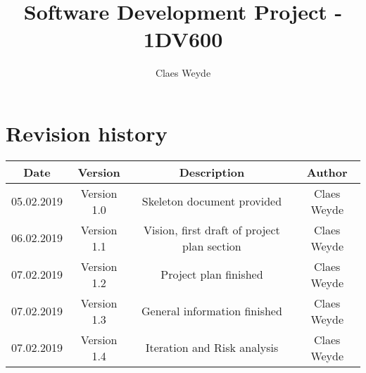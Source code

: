 \documentclass[12pt, letterpaper]{article}
\title{Software Development Project - 1DV600}
\author{Claes Weyde}
\begin{document}
\maketitle
\newpage
\tableofcontents{}
\newpage

\section{Revision history}
\begin{center}
	\begin{tabular}{|c|c|c|c|} 
		\hline
		Date & Version & Description & Author \\ [0.5ex] 
		\hline\hline
		05.02.2019 & Version 1.0 & Skeleton document provided & Claes Weyde \\
		\hline
		06.02.2019 & Version 1.1 & Vision, first draft of project plan section & 
		Claes Weyde \\
		\hline
		07.02.2019 & Version 1.2 & Project plan finished & Claes Weyde \\ [1ex] 
		\hline
		07.02.2019 & Version 1.3 & General information finished & Claes Weyde \\
		\hline
		07.02.2019 & Version 1.4 & Iteration and Risk analysis & Claes Weyde \\ [1ex]
		\hline
		
	\end{tabular}
\end{center}
\newpage
\end{document}
